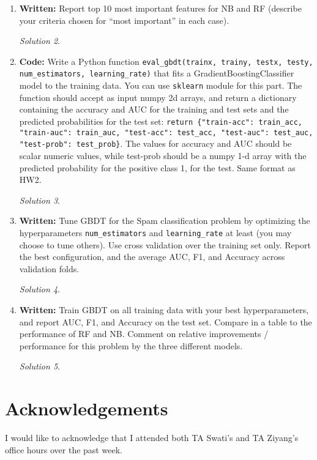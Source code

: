 \documentclass[a4paper,12pt]{article}
\theoremstyle{definition}
\theoremstyle{remark}
\newtheorem*{solution}{Solution}
\begin{document}
\begin{enumerate}
\begin{enumerate}
\begin{solution}
			\end{solution}
			\item {\bf Written:} Report top 10 most important features for NB and RF (describe your criteria chosen for “most
			important” in each case).
			\begin{solution}
				
			\end{solution}
			\item {\bf Code:} Write a Python function {\tt eval\_gbdt(trainx, trainy, testx, testy, num\_estimators, learning\_rate)} that fits
			a GradientBoostingClassifier model to the training data. You can use {\tt sklearn} module for this part. The function should accept as input numpy 2d arrays, and return a dictionary containing the accuracy and AUC for the training and test sets and the predicted probabilities for the test set: {\tt return \{"train-acc": train\_acc, "train-auc": train\_auc, "test-acc": test\_acc, "test-auc": test\_auc, "test-prob": test\_prob\}}. The values for accuracy and AUC should be scalar numeric values, while test-prob should be a numpy 1-d array with the predicted probability for the positive class 1, for the test. Same format as HW2.
			\begin{solution}
				
			\end{solution}
			\item {\bf Written:} Tune GBDT for the Spam classification problem by optimizing the hyperparameters {\tt num\_estimators} and {\tt learning\_rate} at least (you may choose to tune others). Use cross validation over the training set only. Report the best configuration, and the average AUC, F1, and Accuracy across validation folds.
			\begin{solution}
				
			\end{solution}
			\item {\bf Written:} Train GBDT on all training data with your best hyperparameters, and report AUC, F1, and Accuracy
			on the test set. Compare in a table to the performance of RF and NB. Comment on relative improvements / performance for this problem by the three different models.
			\begin{solution}
			
			\end{solution}
		\end{enumerate}
		
	\end{enumerate}
	
	
	
	
	\section*{Acknowledgements}
	I would like to acknowledge that I attended both TA Swati's and TA Ziyang's office hours over the past week.
	
\end{document}
